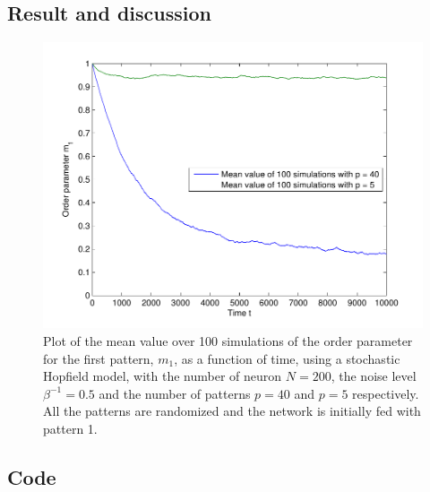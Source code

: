 \documentclass[12pt,a4paper]{article}
\begin{document}
\subsection{Result and discussion}
\begin{figure}\centering
\includegraphics[width=\textwidth]{uppg3.pdf}
\caption{\label{uppg3} Plot of the mean value over 100 simulations of the
order parameter for the first pattern, $m_1$, as a function of time, using
a stochastic Hopfield model, with the number of neuron $N = 200$, the
noise level $\beta^{-1} = 0.5$ and the number of patterns $p = 40$ and $p=5$
respectively. All the patterns are randomized and the network is initially fed with pattern 1. }
\end{figure}
\subsection{Code}



\end{document}
